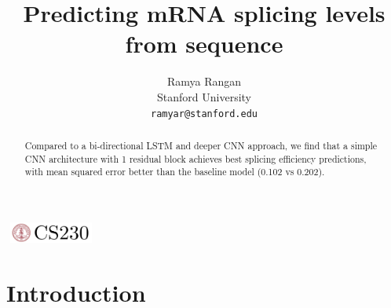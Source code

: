 \documentclass{article}
\title{Predicting mRNA splicing levels from sequence}
\author{
  Ramya Rangan\\
  Stanford University\\
  \texttt{ramyar@stanford.edu} \\
}
\begin{document}

\begin{center}
\includegraphics[width=3cm, height=0.7cm]{../figures/CS230}
\end{center}

\maketitle

\begin{abstract}
Compared to a bi-directional LSTM and deeper CNN approach, we find that a simple CNN architecture with 1 residual block achieves best splicing efficiency predictions, with mean squared error better than the baseline model (0.102 vs 0.202).
\end{abstract}

\section{Introduction}	
\end{document}

